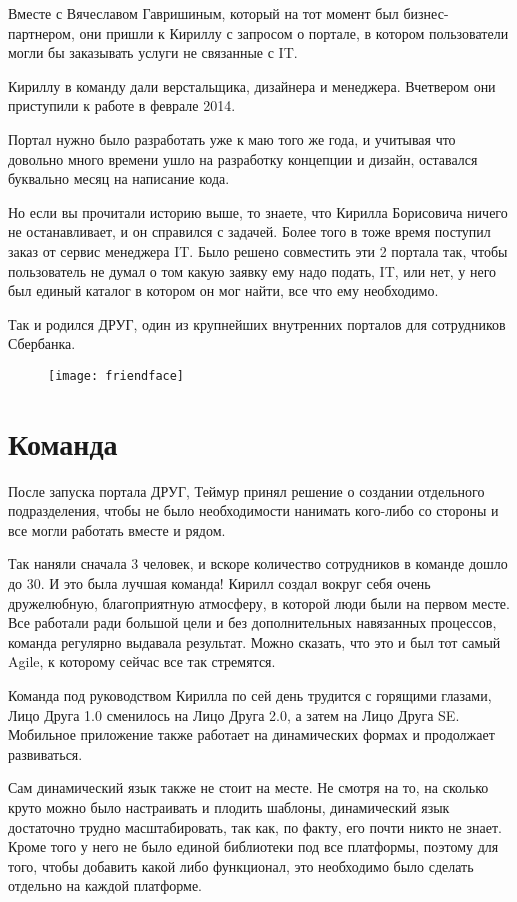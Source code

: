 \documentclass[../index.tex]{subfiles}
\begin{document}
Вместе с Вячеславом Гавришиным, который на тот момент был бизнес-партнером, они пришли к Кириллу с запросом о портале, в котором пользователи могли бы заказывать услуги не связанные с IT. 

Кириллу в команду дали верстальщика, дизайнера и менеджера. Вчетвером они приступили к работе в феврале 2014. 

Портал нужно было разработать уже к маю того же года, и учитывая что довольно много времени ушло на разработку концепции и дизайн, оставался буквально месяц на написание кода. 

Но если вы прочитали историю выше, то знаете, что Кирилла Борисовича ничего не останавливает, и он справился с задачей. Более того в тоже время поступил заказ от сервис менеджера IT.
Было решено совместить эти 2 портала так, чтобы пользователь не думал о том какую заявку ему надо подать, IT, или нет, у него был единый каталог в котором он мог найти, все что ему необходимо. 

Так и родился ДРУГ, один из крупнейших внутренних порталов для сотрудников Сбербанка.

\begin{figure}[H]
	\texttt{[image: friendface]}
	\centering
\end{figure}

\section{Команда}

После запуска портала ДРУГ, Теймур принял решение о создании отдельного подразделения, чтобы не было необходимости нанимать кого-либо со стороны и все могли работать вместе и рядом.  

Так наняли сначала 3 человек, и вскоре количество сотрудников в команде дошло до 30. И это была лучшая команда! Кирилл создал вокруг себя очень дружелюбную, благоприятную атмосферу, в которой люди были на первом месте. Все работали ради большой цели и без дополнительных навязанных процессов, команда регулярно выдавала результат.
Можно сказать, что это и был тот самый Agile, к которому сейчас все так стремятся. 

Команда под руководством Кирилла по сей день трудится с горящими глазами, Лицо Друга 1.0 сменилось на Лицо Друга 2.0, а затем на Лицо Друга SE. Мобильное приложение также работает на динамических формах и продолжает развиваться. 

Сам динамический язык также не стоит на месте. Не смотря на то, на сколько круто можно было настраивать и плодить шаблоны, динамический язык достаточно трудно масштабировать, так как, по факту, его почти никто не знает. Кроме того у него не было единой библиотеки под все платформы, поэтому для того, чтобы добавить какой либо функционал,  это необходимо было сделать отдельно на каждой платформе. 
\end{document}
